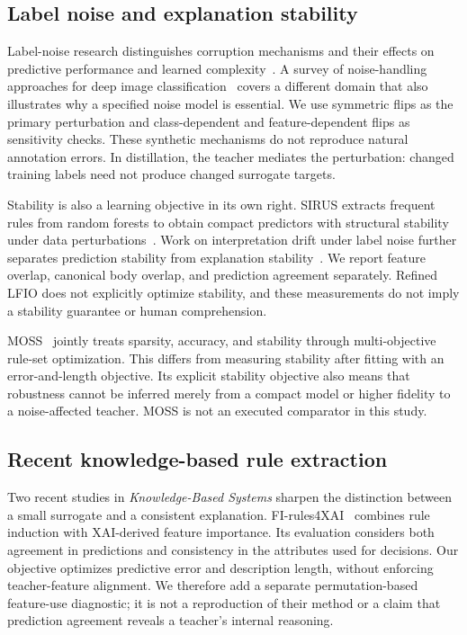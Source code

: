 \documentclass[review,12pt]{elsarticle}
\begin{document}
\subsection{Label noise and explanation stability}
Label-noise research distinguishes corruption mechanisms and their effects on predictive performance and learned complexity~\citep{frenay2014}. A survey of noise-handling approaches for deep image classification~\citep{algan2021} covers a different domain that also illustrates why a specified noise model is essential. We use symmetric flips as the primary perturbation and class-dependent and feature-dependent flips as sensitivity checks. These synthetic mechanisms do not reproduce natural annotation errors. In distillation, the teacher mediates the perturbation: changed training labels need not produce changed surrogate targets.

Stability is also a learning objective in its own right. SIRUS extracts frequent rules from random forests to obtain compact predictors with structural stability under data perturbations~\citep{benard2021}. Work on interpretation drift under label noise further separates prediction stability from explanation stability~\citep{raikovskaia2026}. We report feature overlap, canonical body overlap, and prediction agreement separately. Refined LFIO does not explicitly optimize stability, and these measurements do not imply a stability guarantee or human comprehension.

MOSS~\citep{liu2025moss} jointly treats sparsity, accuracy, and stability through multi-objective rule-set optimization. This differs from measuring stability after fitting with an error-and-length objective. Its explicit stability objective also means that robustness cannot be inferred merely from a compact model or higher fidelity to a noise-affected teacher. MOSS is not an executed comparator in this study.


\subsection{Recent knowledge-based rule extraction}
Two recent studies in \emph{Knowledge-Based Systems} sharpen the distinction between a small surrogate and a consistent explanation. FI-rules4XAI~\citep{kozielski2025} combines rule induction with XAI-derived feature importance. Its evaluation considers both agreement in predictions and consistency in the attributes used for decisions. Our objective optimizes predictive error and description length, without enforcing teacher-feature alignment. We therefore add a separate permutation-based feature-use diagnostic; it is not a reproduction of their method or a claim that prediction agreement reveals a teacher's internal reasoning.
\end{document}
